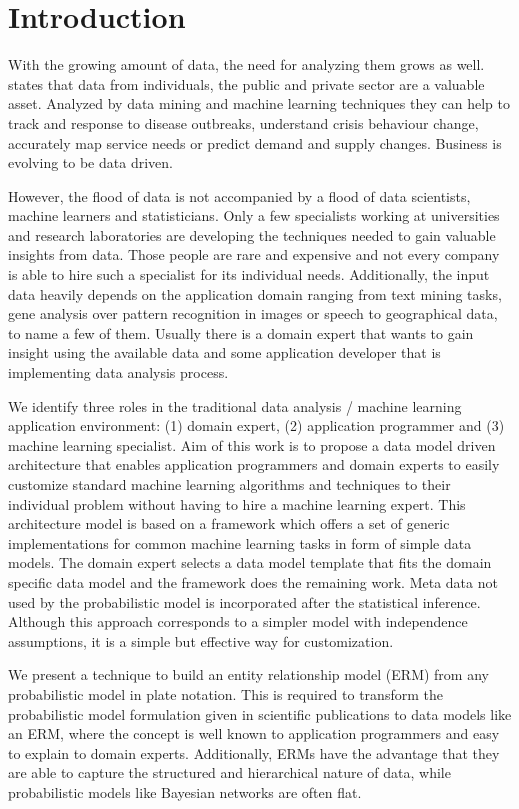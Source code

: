 \section{Introduction}

With the growing amount of data, the need for analyzing them grows as well. \textcite{forum2012bigdata} states that data from individuals, the public and private sector are a valuable asset. Analyzed by data mining and machine learning techniques they can help to track and response to disease outbreaks, understand crisis behaviour change, accurately map service needs or predict demand and supply changes. Business is evolving to be data driven.

However, the flood of data is not accompanied by a flood of data scientists, machine learners and statisticians. Only a few specialists working at universities and research laboratories are developing the techniques needed to gain valuable insights from data. Those people are rare and expensive and not every company is able to hire such a specialist for its individual needs. Additionally, the input data heavily depends on the application domain ranging from text mining tasks, gene analysis over pattern recognition in images or speech to geographical data, to name a few of them. Usually there is a domain expert that wants to gain insight using the available data and some application developer that is implementing data analysis process.

We identify three roles in the traditional data analysis / machine learning application environment: (1) domain expert, (2) application programmer and (3) machine learning specialist. Aim of this work is to propose a data model driven architecture that enables application programmers and domain experts to easily customize standard machine learning algorithms and techniques to their individual problem without having to hire a machine learning expert. This architecture model is based on a framework which offers a set of generic implementations for common machine learning tasks in form of simple data models. The domain expert selects a data model template that fits the domain specific data model and the framework does the remaining work. Meta data not used by the probabilistic model is incorporated after the statistical inference. Although this approach corresponds to a simpler model with independence assumptions, it is a simple but effective way for customization.

We present a technique to build an entity relationship model (ERM) from any probabilistic model in plate notation. This is required to transform the probabilistic model formulation given in scientific publications to data models like an ERM, where the concept is well known to application programmers and easy to explain to domain experts. Additionally, ERMs have the advantage that they are able to capture the structured and hierarchical nature of data, while probabilistic models like Bayesian networks are often flat.

